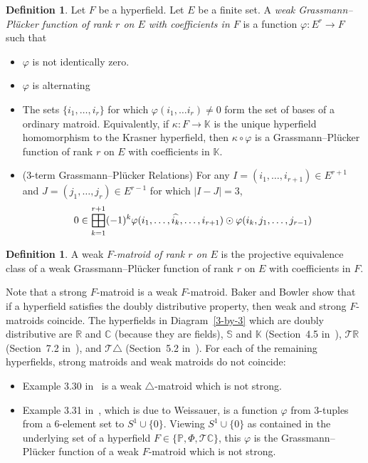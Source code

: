 \documentclass[10pt, preprint]{article}
\theoremstyle{definition}
\newtheorem{definition}[theorem]{Definition}
\newcommand{\bighplus}{
  \mathop{
    \vphantom{\bigoplus} 
    \mathchoice
      {\vcenter{\hbox{\resizebox{\widthof{$\displaystyle\bigoplus$}}{!}{$\boxplus$}}}}
      {\vcenter{\hbox{\resizebox{\widthof{$\bigoplus$}}{!}{$\boxplus$}}}}
      {\vcenter{\hbox{\resizebox{\widthof{$\scriptstyle\oplus$}}{!}{$\boxplus$}}}}
      {\vcenter{\hbox{\resizebox{\widthof{$\scriptscriptstyle\oplus$}}{!}{$\boxplus$}}}}
  }\displaylimits 
}
\begin{document}
\begin{definition}
\cite{Baker-Bowler} Let $F$ be a hyperfield. Let $E$ be a finite
set. A \emph{weak Grassmann--Pl\"{u}cker function of rank $r$ on $E$ with
coefficients in $F$} is a function $\varphi : E^{r} \to F$ such that\vspace*{-2pt}
%
\begin{itemize}%
\item
$\varphi $ is not identically zero.
%
\item
$\varphi $ is alternating
%
\item
The sets $\{i_{1}, \dots , i_{r}\}$ for which $\varphi (i_{1}, \dots
i_{r}) \neq 0$ form the set of bases of a ordinary matroid.
Equivalently, if $\kappa : F \to \mathbb{K}$ is the unique hyperfield
homomorphism to the Krasner hyperfield, then $\kappa \circ \varphi $ is
a Grassmann--Pl\"{u}cker function of rank $r$ on $E$ with coefficients
in $\mathbb{K}$.
%
\item
(3-term Grassmann--Pl\"{u}cker Relations) For any $I= (i_{1}, \dots , i
_{r+1} ) \in E^{r+1}$ and $J = (j_{1}, \dots , j_{r} ) \in E^{r-1}$ for
which $|I-J| = 3$,\vspace*{-1pt}
%
\begin{equation*}
0 \in \bighplus _{k=1}^{r+1} (-1)^{k} \varphi (i_{1}, \ldots ,
\widehat{i_{k}}, \ldots , i_{r+1})\odot \varphi ({i_{k},j_{1}, \ldots
, j_{r-1}})
\end{equation*}
%
\end{itemize}
%
\end{definition}

\begin{definition}
\cite{Baker-Bowler} A weak \emph{$F$-matroid of rank $r$ on $E$}
is the projective equivalence class of a weak Grassmann--Pl\"{u}cker
function of rank $r$ on $E$ with coefficients in $F$.
\end{definition}

Note that a strong $F$-matroid is a weak $F$-matroid. Baker and Bowler
show that if a hyperfield satisfies the doubly distributive property,
then weak and strong $F$-matroids coincide. The hyperfields in
Diagram~\eqref{3-by-3} which are doubly distributive are $\mathbb{R}$
and $\mathbb{C}$ (because they are fields), $\mathbb{S}$ and
$\mathbb{K}$ (Section~4.5 in~\cite{Viro}), $\mathcal{T }
\mathbb{R}$ (Section~7.2 in~\cite{Viro}), and $\mathcal{T }
\triangle $ (Section~5.2 in~\cite{Viro}). For each of the
remaining hyperfields, strong matroids and weak matroids do not
coincide:
%
\begin{itemize}%
\item
Example 3.30 in~\cite{Baker-Bowler} is a weak $\triangle $-matroid
which is not strong.
%
\item
Example 3.31 in~\cite{Baker-Bowler}, which is due to Weissauer,
is a function $\varphi $ from 3-tuples from a 6-element set to
$S^{1}\cup \{0\}$. Viewing $S^{1}\cup \{0\}$ as contained in the
underlying set of a hyperfield $F\in \{\mathbb{P},\Phi ,\mathcal{T }
\mathbb{C}\}$, this $\varphi $ is the Grassmann--Pl\"{u}cker function of
a weak $F$-matroid which is not strong.
\end{itemize}
\end{document}
